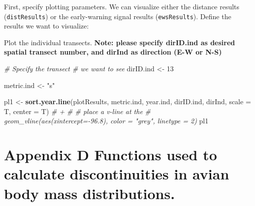 \documentclass[12pt,twoside,openany]{reedthesis}
\newenvironment{Shaded}{\begin{snugshade}}{\end{snugshade}}
\newcommand{\CommentTok}[1]{\textcolor[rgb]{0.56,0.35,0.01}{\textit{#1}}}
\newcommand{\DataTypeTok}[1]{\textcolor[rgb]{0.13,0.29,0.53}{#1}}
\newcommand{\DecValTok}[1]{\textcolor[rgb]{0.00,0.00,0.81}{#1}}
\newcommand{\KeywordTok}[1]{\textcolor[rgb]{0.13,0.29,0.53}{\textbf{#1}}}
\newcommand{\NormalTok}[1]{#1}
\newcommand{\OperatorTok}[1]{\textcolor[rgb]{0.81,0.36,0.00}{\textbf{#1}}}
\newcommand{\StringTok}[1]{\textcolor[rgb]{0.31,0.60,0.02}{#1}}
\begin{document}
First, specify plotting parameters. We can visualize either the distance results (\texttt{distResults}) or the early-warning signal results (\texttt{ewsResults}). Define the results we want to visualize:
\begin{Shaded}
\end{Shaded}
Plot the individual transects. \textbf{Note: please specify dirID.ind as desired spatial transect number, and dirInd as direction (E-W or N-S)}
\begin{Shaded}
\begin{Highlighting}[]
\CommentTok{# Specify the transect # we want to see}
\NormalTok{dirID.ind <-}\StringTok{ }\DecValTok{13}

\NormalTok{metric.ind <-}\StringTok{ "s"}


\NormalTok{pl1 <-}\StringTok{ }\KeywordTok{sort.year.line}\NormalTok{(plotResults, metric.ind, year.ind, dirID.ind, dirInd,  }\DataTypeTok{scale =}\NormalTok{ T, }\DataTypeTok{center =}\NormalTok{ T)}
\CommentTok{# +}
\CommentTok{#     # place a v-line at the}
     \CommentTok{# geom_vline(aes(xintercept=-96.8), color = "grey", linetype = 2)}
\NormalTok{pl1 }
\end{Highlighting}
\end{Shaded}
\appendix

\hypertarget{appDiscont}{%
\chapter*{Appendix D Functions used to calculate discontinuities in avian body mass distributions.}\label{appDiscont}}
\end{document}
